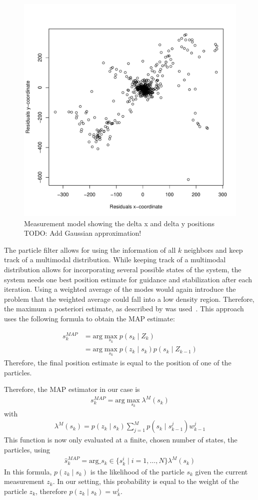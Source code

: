 \documentclass{report}
\begin{document}
\begin{figure}[h!]
\label{fig:measurementmodel}
\begin{center}
\includegraphics[width=0.448\columnwidth]{measurement_model}
\caption{{Measurement model showing the delta x and delta y
    positions
TODO: Add Gaussian approximation!%
}}
\end{center}
\end{figure}
The particle filter allows for using the information of all $k$
neighbors and keep track of a multimodal distribution. While keeping
track of a multimodal distribution allows for incorporating several
possible states of the system, the system needs one best position
estimate for guidance and stabilization after each iteration. Using a
weighted average of the modes would again introduce the problem that
the weighted average could fall into a low density region. Therefore,
the maximum a posteriori estimate, as described by
\citeauthor{driessen2008map} was used~\cite{driessen2008map}. This
approach uses the following formula to obtain the MAP estimate:

\begin{align}
  s_k^{MAP}  &= \text{arg}\max_{s_k}{p(s_k \mid Z_k)}\\
             &= \text{arg}\max_{s_k}{p(z_k \mid s_k) p(s_k \mid Z_{k-1})} 
\end{align}
Therefore, the final position estimate is equal to the position of one
of the particles.

Therefore, the MAP estimator in our case is
\begin{align}
s_k^{MAP} = \text{arg}\max_{s_k} \lambda^M(s_k)
\end{align}
with
\begin{align}
\lambda^M(s_k) = p(z_k \mid s_k) \sum_{j=1}^Mp(s_k \mid s_{k-1}^j)w^j_{k-1}
\end{align}
This function is now only evaluated at a finite, chosen number of
states, the particles, using
\begin{align}
\hat{s}_k^{MAP} = \text{arg}\_{s_k \in \{s_k^i \mid i=1,\ldots,N\}} \lambda^M(s_k)
\end{align}
In this formula, $p(z_k \mid s_k)$ is the likelihood of the particle
$s_k$ given the current measurement $z_k$. In our setting, this
probability is equal to the weight of the particle $z_k$, therefore
$p(z_k \mid s_k) = w^i_k$.
\end{document}
